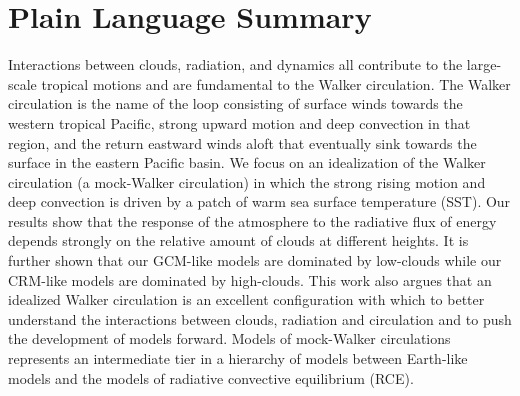 \documentclass[draft]{agujournal2019}
\begin{document}
\begin{abstract}

\end{abstract}

\section*{Plain Language Summary}
Interactions between clouds, radiation, and dynamics all contribute
to the large-scale tropical motions and are fundamental to the Walker circulation.  
The Walker circulation is the name of the loop consisting of surface winds towards the western tropical Pacific, 
strong upward motion and deep convection in that region,  and the return eastward winds aloft that 
eventually sink towards the surface in the eastern Pacific basin.  
We focus on an idealization of the Walker circulation (a mock-Walker circulation) 
in which the strong rising motion and deep convection is driven by a patch of warm sea surface temperature (SST).  
Our results show that the response of the atmosphere to the 
radiative flux of energy depends strongly on the relative amount of clouds at different heights. %
It is further shown that our GCM-like models are dominated by low-clouds while our CRM-like models 
are dominated by high-clouds.  This work also argues that an idealized Walker circulation is an 
excellent configuration with which to better understand the interactions between clouds, radiation and circulation 
and to push the development of models forward.   Models of mock-Walker circulations represents
an intermediate tier in a hierarchy of models between Earth-like models and the models of 
radiative convective equilibrium (RCE).  
\end{document}
